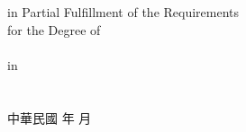 \begin{center}
\relax %
\else
\collEname\\%
\fi
%
\univEname\\%
%
in Partial Fulfillment of the Requirements\\
%
for the Degree of\\
%
\degreeEname\\%
%
in\\
%
\deptEname\\%
%
\eMonth\ \eYear\\%
%
\ePlace%
\vfill
中華民國%
\cYear%
年%
\cMonth%
月\\
\end{center}
\normalsize
\clearpage
%
\newpage%
{\thispagestyle{empty}%
%
\mbox{}\clearpage}

%
\newpage%
{\thispagestyle{empty}%
%
\mbox{}\clearpage}

\newpage%
{\thispagestyle{empty}%
\mbox{}\clearpage}

\newpage%
{\thispagestyle{empty}%
\mbox{}\clearpage}

\newpage%
{\thispagestyle{empty}%
\mbox{}\clearpage}

%
\newpage
\thispagestyle{plain}  %

